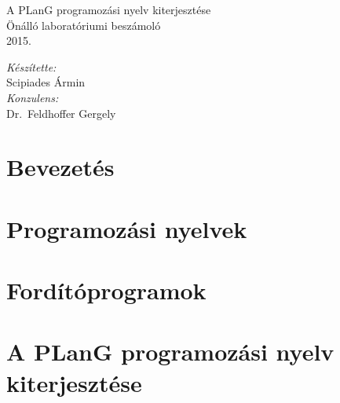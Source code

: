 \documentclass[twoside,11pt,a4paper]{article}
\theoremstyle{plain}
\begin{document}
\pagestyle{empty}
\begin{titlepage}
\newlength\drop
\setlength\drop{0.08\textheight}

\centering
\vspace*{2\drop}

{\huge A PLanG programozási nyelv kiterjesztése}\\[\baselineskip]
{Önálló laboratóriumi beszámoló}\\[\baselineskip]

\vspace*{0.5\drop}
\large 2015.

\vfill
\begin{flushright} \large
\emph{Készítette:}\\
Scipiades Ármin\\[\baselineskip]
\emph{Konzulens:} \\
Dr.~Feldhoffer Gergely
\end{flushright}
\vspace*{\drop}

\end{titlepage}

\null\cleardoublepage

%
\tableofcontents
\null\cleardoublepage
\setcounter{page}{1}
\pagestyle{plain}
\section{Bevezetés}
\label{sec:intro}


\newpage
\section{Programozási nyelvek}
\label{sec:proglang}


\newpage
\section{Fordítóprogramok}
\label{sec:fordprog}


\newpage
\section{A PLanG programozási nyelv kiterjesztése}
\label{sec:xplang}



\newpage
\printbibliography[heading=bibintoc]
\end{document}
